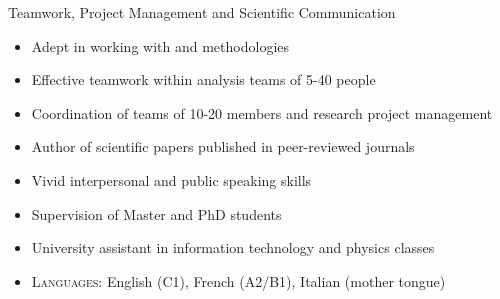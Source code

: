 \begin{cvskills}
\cvskill
{Teamwork, Project Management and Scientific Communication} %
{
\begin{minipage}{0.49\textwidth}
\vspace{0.3em}
\begin{itemize}[labelwidth=\the\widest,align=right,leftmargin=!,labelsep=1pt,noitemsep]
\item[\custItem] Adept in working with \textsc{\color{awesome}{Agile}} and
\textsc{\color{awesome}{Scrum}} methodologies
\item[\custItem] Effective teamwork within analysis teams of 5-40 people
\item[\custItem] Coordination of teams of 10-20 members and research project
management
\end{itemize}
\end{minipage}
\hfill
\begin{minipage}{0.49\textwidth}
\vspace{0.3em}
\begin{itemize}[labelwidth=\the\widest,align=right,leftmargin=!,labelsep=1pt,noitemsep]
\item[\custItem] Author of scientific papers published in peer-reviewed
journals
\item[\custItem] Vivid interpersonal and public speaking skills
\item[\custItem] Supervision of Master and PhD students
\item[\custItem] University assistant in information technology and physics classes
\end{itemize}
\end{minipage}
\begin{itemize}[labelwidth=\the\widest,align=right,leftmargin=!,labelsep=1pt,noitemsep]
\item[] \textsc{\color{awesome}Languages:} English (C1), French (A2/B1),
Italian (mother tongue)
\end{itemize}
}
%

\end{cvskills}
